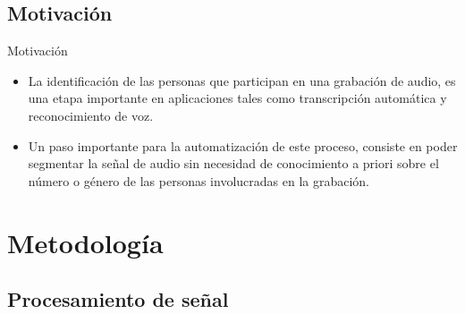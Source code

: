 \documentclass[10pt]{beamer}
\begin{document}
\subsection{Motivación}

\begin{frame}{Motivación}
  \begin{itemize}
    \itemsep 2.5em  
    \item La identificación de las personas que participan en una grabación de audio, 
    es una etapa importante en aplicaciones tales como transcripción automática
    y reconocimiento de voz.
    
    \item Un paso importante para la automatización de este proceso, consiste en poder segmentar
    la señal de audio sin necesidad de conocimiento a priori sobre el número o género de las personas
    involucradas en la grabación.
    
  \end{itemize}
\end{frame}

\section{Metodología}

\subsection{Procesamiento de señal}
\end{document}
